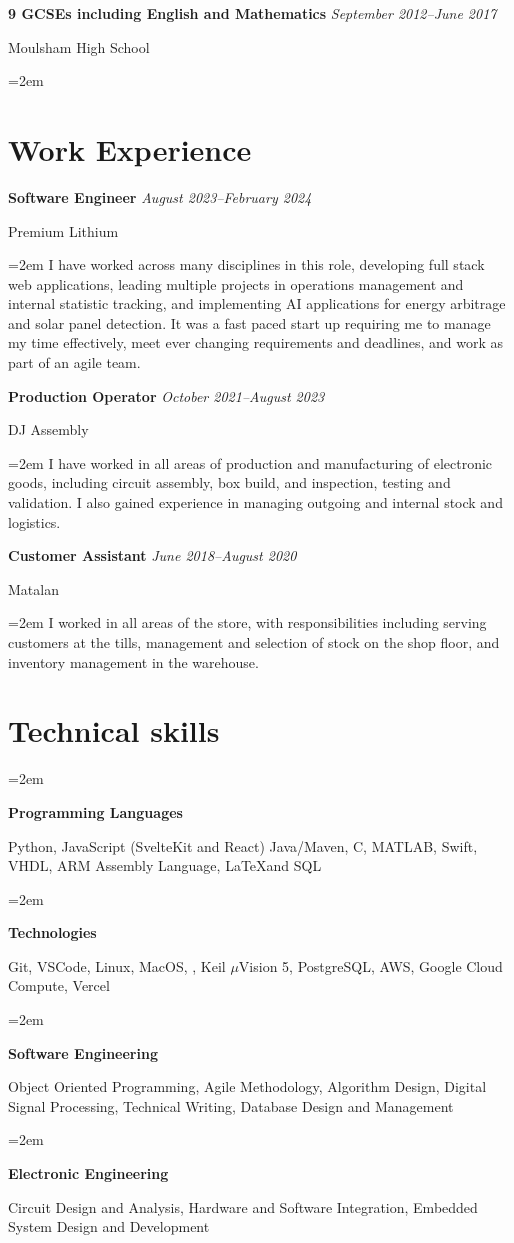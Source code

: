 \documentclass[12pt]{article} %
\newlength{\spacebox}
\newcommand{\skill}[2]{
  \noindent\hangindent=2em\hangafter=0
  \parbox{3\spacebox}{%
  \textbf{#1}} %
  #2 \par} %
\newcommand{\education}[4]{
\noindent  \textbf{#1}
  \newline
  \noindent \textit{#2} \par
  \noindent #3 \par
\vspace*{0.5em}
  \noindent\hangindent=2em\hangafter=0 \small #4
\normalsize \par}
\newcommand{\work}[4]{
  \noindent  \textbf{#1}
  \newline
  \noindent \textit{#2} \par
  \noindent #3 \par
\vspace*{0.5em}
  \noindent\hangindent=2em\hangafter=0 \small #4 
\normalsize \par}
\begin{document}
\education{9 GCSEs including English and Mathematics}{September 2012--June 2017}{Moulsham High School}{}

\section*{Work Experience}
\work{Software Engineer}{August 2023--February 2024}{Premium Lithium}{I have worked across many disciplines in this role, developing full stack web applications, leading multiple projects in operations management and internal statistic tracking, and implementing AI applications for energy arbitrage and solar panel detection. It was a fast paced start up requiring me to manage my time effectively, meet ever changing requirements and deadlines, and work as part of an agile team.}
\newpage
\work{Production Operator}{October 2021--August 2023}{DJ Assembly}{I have worked in all areas of production and manufacturing of electronic goods, including circuit assembly, box build, and inspection, testing and validation. I also gained experience in managing outgoing and internal stock and logistics.}
\work{Customer Assistant}{June 2018--August 2020}{Matalan}{I worked in all areas of the store, with responsibilities including serving customers at the tills, management and selection of stock on the shop floor, and inventory management in the warehouse.}

\section*{Technical skills}

\skill{Programming Languages}{Python, JavaScript (SvelteKit and React) Java/Maven, C, MATLAB, Swift, VHDL, ARM Assembly Language, \LaTeX and SQL}
\skill{Technologies}{Git, VSCode, Linux, MacOS, , Keil $\mu$Vision 5, PostgreSQL, AWS, Google Cloud Compute, Vercel}
\skill{Software Engineering}{Object Oriented Programming, Agile Methodology, Algorithm Design, Digital Signal Processing, Technical Writing, Database Design and Management}
\skill{Electronic Engineering}{Circuit Design and Analysis, Hardware and Software Integration, Embedded System Design and Development}
\end{document}
